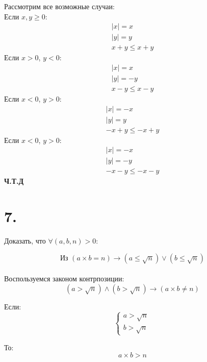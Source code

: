 \documentclass[a4paper,12pt]{article}
\begin{document}
Рассмотрим все возможные случаи:\\
Если $x, y \geq  0$:
\begin{equation*}
\begin{gathered}
|x| = x \\
|y| = y\\
x + y \leq x + y
\end{gathered}
\end{equation*}
Если $ x > 0$, $ y < 0$:
\begin{equation*}
\begin{gathered}
|x| = x \\
|y| = -y\\
x - y \leq x - y
\end{gathered}
\end{equation*}
Если $ x < 0 $, $ y >	 0 $:
\begin{equation*}
\begin{gathered}
|x| = -x \\
|y| = y\\
-x + y \leq -x + y
\end{gathered}
\end{equation*}
Если $ x < 0 $, $ y > 0 $:
\begin{equation*}
\begin{gathered}
|x| = -x \\
|y| = -y\\
-x - y \leq -x - y
\end{gathered}
\end{equation*}
\textbf{Ч.Т.Д}
\section*{7.}
Доказать, что  $\forall (a, b, n) > 0$:

\[ \text{Из } (a \times b = n) \rightarrow (a \leq \sqrt{n}) \vee (b \leq \sqrt{n}) \]\\

Воспользуемся законом контрпозиции:\\
\[ (a > \sqrt{n}) \wedge  (b > \sqrt{n}) \rightarrow (a \times b \neq n)\]

Если: 
\begin{equation*}
 \begin{cases}
   a > \sqrt{n} 
   \\
   b > \sqrt{n}
 \end{cases}
\end{equation*}

То:
\[ a \times b > n\]
\end{document}
